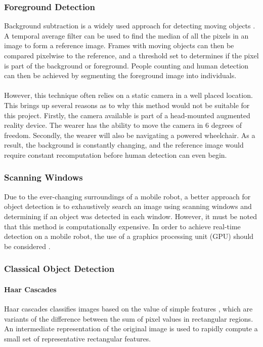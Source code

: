 \subsubsection{Foreground Detection}
Background subtraction is a widely used approach for detecting moving objects \cite{Piccardi2004}. A temporal average filter can be used to find the median of all the pixels in an image to form a reference image. Frames with moving objects can then be compared pixelwise to the reference, and a threshold set to determines if the pixel is part of the background or foreground. People counting and human detection can then be achieved by segmenting the foreground image into individuals.

\paragraph{} However, this technique often relies on a static camera in a well placed location. This brings up several reasons as to why this method would not be suitable for this project. Firstly, the camera available is part of a head-mounted augmented reality device. The wearer has the ability to move the camera in 6 degrees of freedom. Secondly, the wearer will also be navigating a powered wheelchair. As a result, the background is constantly changing, and the reference image would require constant recomputation before human detection can even begin.

\subsubsection{Scanning Windows}
Due to the ever-changing surroundings of a mobile robot, a better approach for object detection is to exhaustively search an image using scanning windows and determining if an object was detected in each window. However, it must be noted that this method is computationally expensive. In order to achieve real-time detection on a mobile robot, the use of a graphics processing unit (GPU) should be considered \cite{Hirabayashi}.

\subsubsection{Classical Object Detection}

\paragraph{Haar Cascades}
Haar cascades classifies images based on the value of simple features \cite{Viola2001}, which are variants of the difference between the sum of pixel values in rectangular regions. An intermediate representation of the original image is used to rapidly compute a small set of representative rectangular features.

